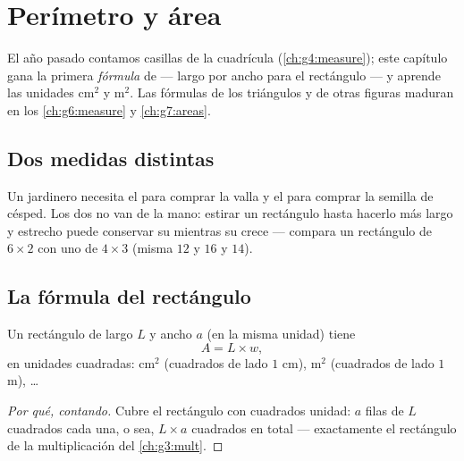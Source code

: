 \chapter{Perímetro y área}\label{ch:g5:areas}

El año pasado contamos casillas de la cuadrícula (\cref{ch:g4:measure}); este capítulo
gana la primera \emph{fórmula} de  --- largo por ancho para el
rectángulo --- y aprende las unidades cm$^2$ y m$^2$. Las fórmulas de los
triángulos y de otras figuras maduran en los \cref{ch:g6:measure} y
\cref{ch:g7:areas}.

\section{Dos medidas distintas}

\begin{example}\label{ex:g5:areas:contrast}
Un jardinero necesita el \emph{} para comprar la valla y el \emph{}
para comprar la semilla de césped. Los dos no van de la mano: estirar
un rectángulo hasta hacerlo más largo y estrecho puede conservar su  mientras su 
crece --- compara un rectángulo de $6 \times 2$ con uno de $4 \times 3$
(misma  $12$ y  $16$ y $14$).
\end{example}

\section{La fórmula del rectángulo}

\begin{proposition}\label{prop:g5:areas:rectangle}
Un rectángulo de largo $L$ y ancho $a$ (en la misma unidad) tiene 
\[
A = L \times w ,
\]
en unidades cuadradas: cm$^2$ (cuadrados de lado $1$ cm), m$^2$ (cuadrados de
lado $1$ m), \dots
\end{proposition}

\begin{proof}[Por qué, contando]
Cubre el rectángulo con cuadrados unidad: $a$ filas de $L$ cuadrados cada una,
o sea, $L \times a$ cuadrados en total --- exactamente el rectángulo
de la multiplicación del \cref{ch:g3:mult}.
\end{proof}

